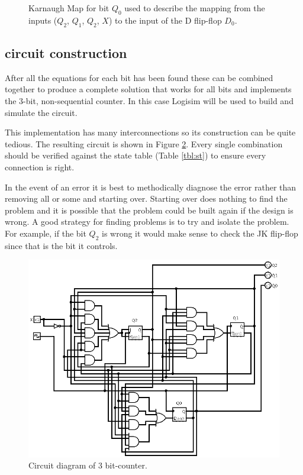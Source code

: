 \documentclass[12pt]{article}
\begin{document}
\begin{figure}
\center
{}
\caption{Karnaugh Map for bit $Q_0$ used to describe the mapping from
the inputs ($Q_2$, $Q_1$, $Q_2$, $X$) to the input of the D flip-flop $D_0$.}
\label{fig:kmapQ0}
\end{figure}

\subsection{circuit construction}

After all the equations for each bit has been found these
can be combined together to produce a complete solution that works
for all bits and implements the 3-bit, non-sequential counter.
In this case Logisim\cite{LOGISIM} will be used to build and simulate the circuit.

This implementation has many interconnections so its construction
can be quite tedious.
The resulting circuit is shown in Figure \ref{fig:circ}.
Every single combination should be verified against the
state table (Table \ref{tbl:st}) to ensure every connection is right.

In the event of an error it is best to methodically diagnose the error
rather than removing all or some and starting over.
Starting over does nothing to find the problem and it is possible that
the problem could be built again if the design is wrong.
A good strategy for finding problems is to try and isolate the problem.
For example, if the bit $Q_2$ is wrong it would make sense to check
the JK flip-flop since that is the bit it controls.

\begin{figure}
\center
\includegraphics[scale=0.5]{lab11-circuit}
\caption{Circuit diagram of 3 bit-counter.}
\label{fig:circ}
\end{figure}
\end{document}
